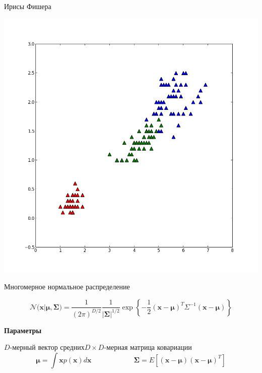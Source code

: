 \documentclass[aspectratio=169]{beamer}
\begin{document}
\begin{frame}{Ирисы Фишера}
\begin{center}
\includegraphics[scale=0.2]{images/iris23.png}
\end{center}

\end{frame}

\begin{frame}{Многомерное нормальное распределение}

\[
\mathcal{N(\mathbf{x} | \mathbf{\mu}, \mathbf{\Sigma}}) = \frac{1}{(2 \pi)^{D/2}} \frac{1}{|\mathbf{\Sigma}|^{1/2}} \exp \left\{-\frac{1}{2}(\mathbf{x} - \mathbf{\mu})^T \Sigma^{-1} (\mathbf{x} - \mathbf{\mu})\right\}
\]

\vspace{0.7em}
\begin{center}
{\bf Параметры}
\end{center}
\quad${D}$-мерный вектор средних\qquad$D \times D$-мерная матрица ковариации 
\[
\mathbf{\mu} = \int \mathbf{x} p({\mathbf{x}}) d\mathbf{x}
\qquad\qquad\qquad
\mathbf{\Sigma} = E[(\mathbf{x} - \mathbf{\mu})(\mathbf{x} - \mathbf{\mu})^T]
\]

\end{frame}
\end{document}
